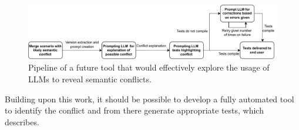 \begin{figure}[tb!]
    \centering
    \includegraphics[width=1\linewidth]{figures/tool.pdf}
    \caption{Pipeline of a future tool that would effectively explore the usage
    of LLMs to reveal semantic conflicts.}
    \label{fig:tool}
\end{figure}

Building upon this work, it should be possible to develop a fully automated tool to identify the conflict and from there generate appropriate tests,
which  describes.
